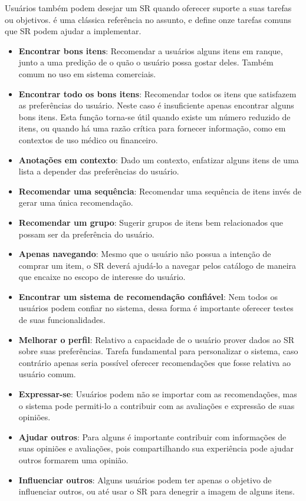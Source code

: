 Usuários também podem desejar um SR quando oferecer suporte a suas tarefas ou objetivos. \cite{Herlocker:2004:ECF:963770.963772} é uma clássica referência no assunto, e define onze tarefas comuns que SR podem ajudar a implementar. 

\begin{itemize}
	\item{\textbf{Encontrar bons itens}: Recomendar a usuários alguns itens em ranque, junto a uma predição de o quão o usuário possa gostar deles. Também comum no uso em sistema comerciais.}

	\item{\textbf{Encontrar todo os bons itens}: Recomendar todos os itens que satisfazem as preferências do usuário. Neste caso é insuficiente apenas encontrar alguns bons itens. Esta função torna-se útil quando existe um número reduzido de itens, ou quando há uma razão crítica para fornecer informação, como em contextos de uso médico ou financeiro.}

	\item{\textbf{Anotações em contexto}: Dado um contexto, enfatizar alguns itens de uma lista a depender das preferências do usuário.}

	\item{\textbf{Recomendar uma sequência}: Recomendar uma sequência de itens invés de gerar uma única recomendação.}

	\item{\textbf{Recomendar um grupo}: Sugerir grupos de itens bem relacionados que possam ser da preferência do usuário.}

	\item{\textbf{Apenas navegando}: Mesmo que o usuário não possua a intenção de comprar um item, o SR deverá ajudá-lo a navegar pelos catálogo de maneira que encaixe no escopo de interesse do usuário.}

	\item{\textbf{Encontrar um sistema de recomendação confiável}: Nem todos os usuários podem confiar no sistema, dessa forma é importante oferecer testes de suas funcionalidades.}

	\item{\textbf{Melhorar o perfil}: Relativo a capacidade de o usuário prover dados ao SR sobre suas preferências. Tarefa fundamental para personalizar o sistema, caso contrário apenas seria possível oferecer recomendações que fosse relativa ao usuário comum.}

	\item{\textbf{Expressar-se}: Usuários podem não se importar com as recomendações, mas o sistema pode permiti-lo a contribuir com as avaliações e expressão de suas opiniões.}

	\item{\textbf{Ajudar outros}: Para alguns é importante contribuir com informações de suas opiniões e avaliações, pois compartilhando sua experiência pode ajudar outros formarem uma opinião.}

	\item{\textbf{Influenciar outros}: Alguns usuários podem ter apenas o objetivo de influenciar outros, ou até usar o SR para denegrir a imagem de alguns itens.}
\end{itemize}

